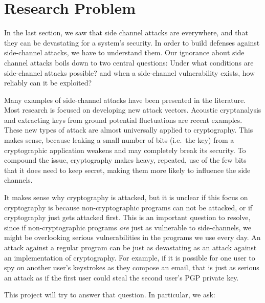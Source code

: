 \documentclass{acm_proc_article-sp}
\begin{document}
\section{Research Problem}
\label{sec:problem}

In the last section, we saw that side channel attacks are everywhere, and that
they can be devastating for a system's security. In order to build defenses
against side-channel attacks, we have to understand them. Our ignorance about
side channel attacks boils down to two central questions: Under what conditions
are side-channel attacks possible? and when a side-channel vulnerability exists,
how reliably can it be exploited?

Many examples of side-channel attacks have been presented in the literature.
Most research is focused on developing new attack vectors. Acoustic
cryptanalysis \cite{genkin2013rsa} and extracting keys from ground potential
fluctuations \cite{genkin2014get} are recent examples. These new types of attack
are almost universally applied to cryptography. This makes sense, because
leaking a small number of bits (i.e.\ the key) from a cryptographic application
weakens and may completely break its security. To compound the issue,
cryptography makes heavy, repeated, use of the few bits that it does need to
keep secret, making them more likely to influence the side channels.

It makes sense why cryptography is attacked, but it is unclear if this focus on
cryptography is because non-cryptographic programs can not be attacked, or if
cryptography just gets attacked first. This is an important question to resolve,
since if non-cryptographic programs \emph{are} just as vulnerable to
side-channels, we might be overlooking serious vulnerabilities in the programs
we use every day. An attack against a regular program can be just as devastating
as an attack against an implementation of cryptography. For example, if it is
possible for one user to spy on another user's keystrokes as they compose an
email, that is just as serious an attack as if the first user could steal the
second user's PGP private key.

This project will try to answer that question. In particular, we ask:
\end{document}
